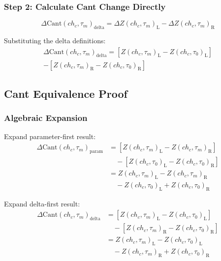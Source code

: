 \documentclass{article}
\newcommand{\chainage}[1]{ch_{#1}}
\newcommand{\Left}{\text{L}}
\newcommand{\Right}{\text{R}}
\newcommand{\Z}[3]{Z(#1, #2)_{#3}}
\newcommand{\DZ}[3]{\Delta Z(#1, #2)_{#3}}
\newcommand{\DCant}[2]{\Delta\text{Cant}(#1, #2)}
\begin{document}
\subsubsection{Step 2: Calculate Cant Change Directly}
\begin{equation}
\DCant{\chainage{c}}{\tau_m}_{\text{delta}} = \DZ{\chainage{c}}{\tau_m}{\Left} - \DZ{\chainage{c}}{\tau_m}{\Right}
\end{equation}

Substituting the delta definitions:
\begin{multline}
\DCant{\chainage{c}}{\tau_m}_{\text{delta}} = \left[\Z{\chainage{c}}{\tau_m}{\Left} - \Z{\chainage{c}}{\tau_0}{\Left}\right] \\
- \left[\Z{\chainage{c}}{\tau_m}{\Right} - \Z{\chainage{c}}{\tau_0}{\Right}\right]
\end{multline}

\subsection{Cant Equivalence Proof}

\subsubsection{Algebraic Expansion}
Expand parameter-first result:
\begin{align}
\DCant{\chainage{c}}{\tau_m}_{\text{param}} &= \left[\Z{\chainage{c}}{\tau_m}{\Left} - \Z{\chainage{c}}{\tau_m}{\Right}\right] \\
&\quad - \left[\Z{\chainage{c}}{\tau_0}{\Left} - \Z{\chainage{c}}{\tau_0}{\Right}\right] \\
&= \Z{\chainage{c}}{\tau_m}{\Left} - \Z{\chainage{c}}{\tau_m}{\Right} \\
&\quad - \Z{\chainage{c}}{\tau_0}{\Left} + \Z{\chainage{c}}{\tau_0}{\Right}
\end{align}

Expand delta-first result:
\begin{align}
\DCant{\chainage{c}}{\tau_m}_{\text{delta}} &= \left[\Z{\chainage{c}}{\tau_m}{\Left} - \Z{\chainage{c}}{\tau_0}{\Left}\right] \\
&\quad - \left[\Z{\chainage{c}}{\tau_m}{\Right} - \Z{\chainage{c}}{\tau_0}{\Right}\right] \\
&= \Z{\chainage{c}}{\tau_m}{\Left} - \Z{\chainage{c}}{\tau_0}{\Left} \\
&\quad - \Z{\chainage{c}}{\tau_m}{\Right} + \Z{\chainage{c}}{\tau_0}{\Right}
\end{align}
\end{document}
